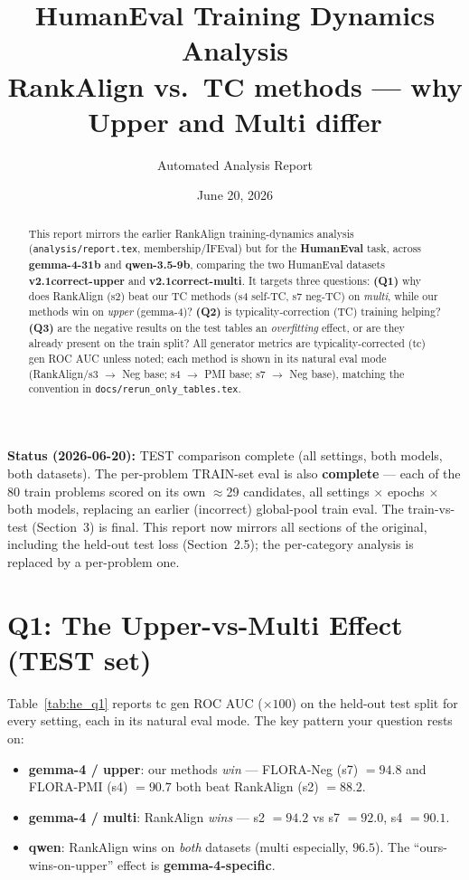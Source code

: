 \documentclass[11pt,a4paper]{article}
\title{HumanEval Training Dynamics Analysis\\
\large RankAlign vs.\ TC methods --- why Upper and Multi differ}
\author{Automated Analysis Report}
\date{June 20, 2026}
\begin{document}
\maketitle

\begin{abstract}
This report mirrors the earlier RankAlign training-dynamics analysis
(\texttt{analysis/report.tex}, membership/IFEval) but for the \textbf{HumanEval} task,
across \textbf{gemma-4-31b} and \textbf{qwen-3.5-9b}, comparing the two HumanEval datasets
\textbf{v2.1correct-upper} and \textbf{v2.1correct-multi}. It targets three questions:
\textbf{(Q1)} why does RankAlign (s2) beat our TC methods (s4 self-TC, s7 neg-TC) on
\emph{multi}, while our methods win on \emph{upper} (gemma-4)?
\textbf{(Q2)} is typicality-correction (TC) training helping?
\textbf{(Q3)} are the negative results on the test tables an \emph{overfitting} effect, or
are they already present on the train split?
All generator metrics are typicality-corrected (tc) gen ROC AUC unless noted; each method is
shown in its natural eval mode (RankAlign/s3 $\to$ Neg base; s4 $\to$ PMI base; s7 $\to$
Neg base), matching the convention in \texttt{docs/rerun\_only\_tables.tex}.
\end{abstract}

\noindent\textbf{Status (2026-06-20):} TEST comparison complete (all settings, both models,
both datasets). The per-problem TRAIN-set eval is also \textbf{complete} --- each of the 80
train problems scored on its own $\approx$29 candidates, all settings $\times$ epochs $\times$
both models, replacing an earlier (incorrect) global-pool train eval. The train-vs-test
(Section~3) is final. This report now mirrors all sections of the original, including the
held-out test loss (Section~2.5); the per-category analysis is replaced by a per-problem one.

\tableofcontents
\newpage

\section{Q1: The Upper-vs-Multi Effect (TEST set)}

Table~\ref{tab:he_q1} reports tc gen ROC AUC ($\times100$) on the held-out test split for
every setting, each in its natural eval mode. The key pattern your question rests on:

\begin{itemize}
\item \textbf{gemma-4 / upper}: our methods \emph{win} --- FLORA-Neg (s7) $=94.8$ and
FLORA-PMI (s4) $=90.7$ both beat RankAlign (s2) $=88.2$.
\item \textbf{gemma-4 / multi}: RankAlign \emph{wins} --- s2 $=94.2$ vs s7 $=92.0$, s4 $=90.1$.
\item \textbf{qwen}: RankAlign wins on \emph{both} datasets (multi especially, $96.5$). The
``ours-wins-on-upper'' effect is \textbf{gemma-4-specific}.
\end{itemize}
\end{document}
